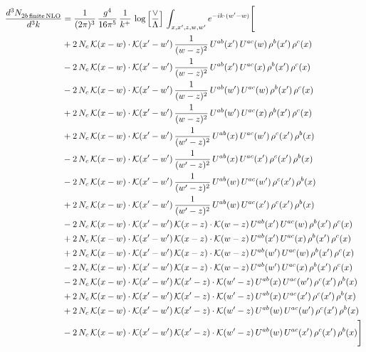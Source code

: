 \documentclass[9pt]{article}
\numberwithin{equation}{section}
\begin{document}
\begin{align}
\frac{d^{3}N_{2b\,\rm finite\, NLO}^{\rm}}{d^{3}k} & = \frac{1}{(2\pi)^{3}}\,\frac{g^{4}}{16\pi^{5}}\,\frac{1}{k^{+}}\,\log{\left[\frac{\vee}{\Lambda}\right]}\,\int_{x,x',z,w,w'}e^{-ik\cdot(w'-w)}\Bigg[\notag\\ & +2\,N_{c}\,\mathcal{K}(x-w)\cdot\mathcal{K}(x'-w')\,\frac{1}{(w-z)^{2}}\,U^{ab}(x')\,U^{ac}(w)\,\rho^{b}(x')\,\rho^{c}(x)\notag\\
&-2\,N_{c}\,\mathcal{K}(x-w)\cdot\mathcal{K}(x'-w')\,\frac{1}{(w-z)^{2}}\,U^{ab}(x')\,U^{ac}(x)\,\rho^{b}(x')\,\rho^{c}(x)\notag\\
&-2\,N_{c}\,\mathcal{K}(x-w)\cdot\mathcal{K}(x'-w')\,\frac{1}{(w-z)^{2}}\,U^{ab}(w')\,U^{ac}(w)\,\rho^{b}(x')\,\rho^{c}(x)\notag\\
&+2\,N_{c}\,\mathcal{K}(x-w)\cdot\mathcal{K}(x'-w')\,\frac{1}{(w-z)^{2}}\,U^{ab}(w')\,U^{ac}(x)\,\rho^{b}(x')\,\rho^{c}(x)\notag\\
&+2\,N_{c}\,\mathcal{K}(x-w)\cdot\mathcal{K}(x'-w')\,\frac{1}{(w'-z)^{2}}\,U^{ab}(x)\,U^{ac}(w')\,\rho^{c}(x')\,\rho^{b}(x)\notag\\
&-2\,N_{c}\,\mathcal{K}(x-w)\cdot\mathcal{K}(x'-w')\,\frac{1}{(w'-z)^{2}}\,U^{ab}(x)\,U^{ac}(x')\,\rho^{c}(x')\,\rho^{b}(x)\notag\\
&-2\,N_{c}\,\mathcal{K}(x-w)\cdot\mathcal{K}(x'-w')\,\frac{1}{(w'-z)^{2}}\,U^{ab}(w)\,U^{ac}(w')\,\rho^{c}(x')\,\rho^{b}(x)\notag\\
&+2\,N_{c}\,\mathcal{K}(x-w)\cdot\mathcal{K}(x'-w')\,\frac{1}{(w'-z)^{2}}\,U^{ab}(w)\,U^{ac}(x')\,\rho^{c}(x')\,\rho^{b}(x)\notag\\
&-2\,N_{c}\,\mathcal{K}(x-w)\cdot\mathcal{K}(x'-w')\,\mathcal{K}(x-z)\cdot\mathcal{K}(w-z)\,U^{ab}(x')\,U^{ac}(w)\,\rho^{b}(x')\,\rho^{c}(x)\notag\\
&+2\,N_{c}\,\mathcal{K}(x-w)\cdot\mathcal{K}(x'-w')\,\mathcal{K}(x-z)\cdot\mathcal{K}(w-z)\,U^{ab}(x')\,U^{ac}(x)\,\rho^{b}(x')\,\rho^{c}(x)\notag\\
&+2\,N_{c}\,\mathcal{K}(x-w)\cdot\mathcal{K}(x'-w')\,\mathcal{K}(x-z)\cdot\mathcal{K}(w-z)\,U^{ab}(w')\,U^{ac}(w)\,\rho^{b}(x')\,\rho^{c}(x)\notag\\
&-2\,N_{c}\,\mathcal{K}(x-w)\cdot\mathcal{K}(x'-w')\,\mathcal{K}(x-z)\cdot\mathcal{K}(w-z)\,U^{ab}(w')\,U^{ac}(x)\,\rho^{b}(x')\,\rho^{c}(x)\notag\\
&-2\,N_{c}\,\mathcal{K}(x-w)\cdot\mathcal{K}(x'-w')\,\mathcal{K}(x'-z)\cdot\mathcal{K}(w'-z)\,U^{ab}(x)\,U^{ac}(w')\,\rho^{c}(x')\,\rho^{b}(x)\notag\\
&+2\,N_{c}\,\mathcal{K}(x-w)\cdot\mathcal{K}(x'-w')\,\mathcal{K}(x'-z)\cdot\mathcal{K}(w'-z)\,U^{ab}(x)\,U^{ac}(x')\,\rho^{c}(x')\,\rho^{b}(x)\notag\\
&+2\,N_{c}\,\mathcal{K}(x-w)\cdot\mathcal{K}(x'-w')\,\mathcal{K}(x'-z)\cdot\mathcal{K}(w'-z)\,U^{ab}(w)\,U^{ac}(w')\,\rho^{c}(x')\,\rho^{b}(x)\notag\\
&-2\,N_{c}\,\mathcal{K}(x-w)\cdot\mathcal{K}(x'-w')\,\mathcal{K}(x'-z)\cdot\mathcal{K}(w'-z)\,U^{ab}(w)\,U^{ac}(x')\,\rho^{c}(x')\,\rho^{b}(x)\Bigg]
\end{align}
\end{document}
